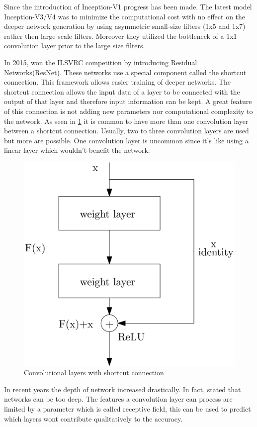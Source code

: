 \documentclass[
a4paper, 
12pt,
grayscalebody, %
abstract=on,
twoside, BCOR10mm, 12pt, DIV13,headinclude, footexclude, final, abstracton, openright
]{ibireprt}
\numberwithin{equation}{chapter}
\numberwithin{table}{chapter}
\numberwithin{figure}{chapter}
\numberwithin{algorithm}{chapter}
\numberwithin{example}{chapter}
\numberwithin{example}{chapter}
\begin{document}
Since the introduction of Inception-V1 progress has been made. The latest model Inception-V3/V4 was to minimize the computational cost with no effect on the deeper network generation by using asymmetric small-size filters (1x5 and 1x7) rather then large scale filters. Moreover they utilized the bottleneck of a 1x1 convolution layer prior to the large size filters. 

In 2015,\cite{He2016a} won the ILSVRC competition by introducing Residual Networks(ResNet). These networks use a special component called the shortcut connection. This framework allows easier training of deeper networks. The shortcut connection allows the input data of a layer to be connected with the output of that layer and therefore input information can be kept. A great feature of this connection is not adding new parameters nor computational complexity to the network. As seen in \ref{fig:ResNet_block} it is common to have more than one convolution layer between a shortcut connection. Usually, two to three convolution layers are used but more are possible. One convolution layer is uncommon since it's like using a linear layer which wouldn't benefit the network.


\begin{figure}[h]	
	\center
	\includegraphics[width = 0.4 \textwidth]{conv_layer_with_skip_connection.png}%
	\caption{Convolutional layers with shortcut connection}
	\label{fig:ResNet_block}
\end{figure}%

In recent years the depth of network increased drastically. In fact, \cite{Richter2021} stated that networks can be too deep. The features a convolution layer can process are limited by a parameter which is called receptive field, this can be used to predict which layers wont contribute qualitatively to the accuracy.
\end{document}
